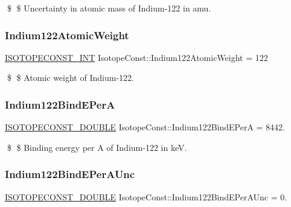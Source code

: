 \$ \$ Uncertainty in atomic mass of Indium-\/122 in amu. \mbox{\label{group___isotope_const-_indium-_in122_ga28310a9f2e0d0f73006112f0cab03b8c}} 
\subsubsection{\texorpdfstring{Indium122\+Atomic\+Weight}{Indium122AtomicWeight}}
{\footnotesize\ttfamily \mbox{\hyperlink{group___isotope_const-_macros_ga5f18360b3e99483a35c32d789e62621c}{I\+S\+O\+T\+O\+P\+E\+C\+O\+N\+S\+T\+\_\+\+I\+NT}} Isotope\+Const\+::\+Indium122\+Atomic\+Weight = 122}

\$ \$ Atomic weight of Indium-\/122. \mbox{\label{group___isotope_const-_indium-_in122_gae70996dfcbd3e21aae2a0043c31525ea}} 
\subsubsection{\texorpdfstring{Indium122\+Bind\+E\+PerA}{Indium122BindEPerA}}
{\footnotesize\ttfamily \mbox{\hyperlink{group___isotope_const-_macros_ga8f45a7272ce02c0b4c65c44636ed719a}{I\+S\+O\+T\+O\+P\+E\+C\+O\+N\+S\+T\+\_\+\+D\+O\+U\+B\+LE}} Isotope\+Const\+::\+Indium122\+Bind\+E\+PerA = 8442.}

\$ \$ Binding energy per A of Indium-\/122 in keV. \mbox{\label{group___isotope_const-_indium-_in122_gad9f6ab52a59d323bcf119837e8d2257e}} 
\subsubsection{\texorpdfstring{Indium122\+Bind\+E\+Per\+A\+Unc}{Indium122BindEPerAUnc}}
{\footnotesize\ttfamily \mbox{\hyperlink{group___isotope_const-_macros_ga8f45a7272ce02c0b4c65c44636ed719a}{I\+S\+O\+T\+O\+P\+E\+C\+O\+N\+S\+T\+\_\+\+D\+O\+U\+B\+LE}} Isotope\+Const\+::\+Indium122\+Bind\+E\+Per\+A\+Unc = 0.}

